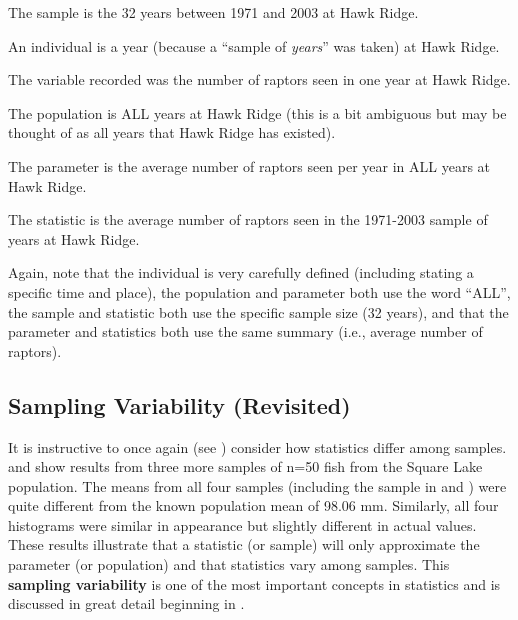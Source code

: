 \documentclass[10pt,openany]{book}\usepackage[]{graphicx}\usepackage[]{color}
\begin{document}
\begin{Itemize}
  \item The sample is the 32 years between 1971 and 2003 at Hawk Ridge.
  \item An individual is a year (because a ``sample of \emph{years}'' was taken) at Hawk Ridge.
  \item The variable recorded was the number of raptors seen in one year at Hawk Ridge.
  \item The population is ALL years at Hawk Ridge (this is a bit ambiguous but may be thought of as all years that Hawk Ridge has existed).
  \item The parameter is the average number of raptors seen per year in ALL years at Hawk Ridge.
  \item The statistic is the average number of raptors seen in the 1971-2003 sample of years at Hawk Ridge.
\end{Itemize}

Again, note that the individual is very carefully defined (including stating a specific time and place), the population and parameter both use the word ``ALL'', the sample and statistic both use the specific sample size (32 years), and that the parameter and statistics both use the same summary (i.e., average number of raptors).


\vspace{-12pt}

\vspace{-12pt}

\vspace{-12pt}


\subsection{Sampling Variability (Revisited)}
It is instructive to once again (see ) consider how statistics differ among samples.  and  show results from three more samples of n=50 fish from the Square Lake population. The means from all four samples (including the sample in  and ) were quite different from the known population mean of 98.06 mm. Similarly, all four histograms were similar in appearance but slightly different in actual values. These results illustrate that a statistic (or sample) will only approximate the parameter (or population) and that statistics vary among samples. This \textbf{sampling variability} is one of the most important concepts in statistics and is discussed in great detail beginning in .
\end{document}
